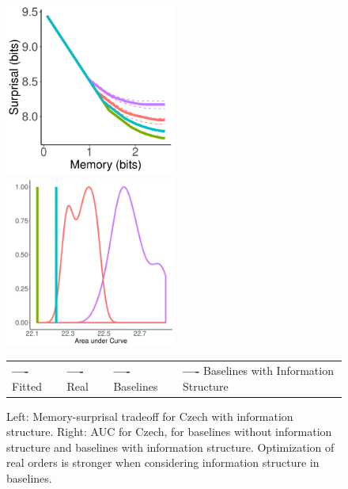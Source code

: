 \begin{figure}
\includegraphics[width=0.5\textwidth]{figures/Czech-PDT-listener-surprisal-memory-MEDIANS_onlyWordForms_boundedVocab.pdf}
\includegraphics[width=0.5\textwidth]{figures/Czech-PDT-listener-surprisal-memory-HIST_AUC_onlyWordForms_boundedVocab_REAL-infostruc.pdf}

\begin{center}
\begin{tabular}{llll}
\textbf{\textcolor{fitted_czech}{----}} Fitted&
\textbf{\textcolor{real_czech}{----}} Real&
\textbf{\textcolor{baseline_czech}{----}} Baselines&
\textbf{\textcolor{baselineInfo_czech}{----}} Baselines with Information Structure
\end{tabular}
\end{center}
	\caption{Left: Memory-surprisal tradeoff for Czech with information structure. Right: AUC for Czech, for baselines without information structure and baselines with information structure. Optimization of real orders is stronger when considering information structure in baselines. }\label{fig:median-czech-infostruc}
\end{figure}


